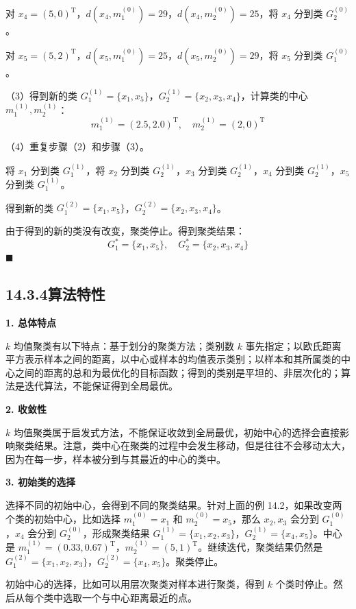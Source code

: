 \documentclass[UTF8, 12pt, fontset=fandol, oneside]{ctexart}
\begin{document}
对 $x_4=(5,0)^{\mathrm{T}}$，$d(x_4,m_1^{(0)})=29$，$d(x_4,m_2^{(0)})=25$，将 $x_4$ 分到类 $G_2^{(0)}$。

对 $x_5=(5,2)^{\mathrm{T}}$，$d(x_5,m_1^{(0)})=25$，$d(x_5,m_2^{(0)})=29$，将 $x_5$ 分到类 $G_1^{(0)}$。

（3）得到新的类 $G_1^{(1)}=\{x_1,x_5\}$，$G_2^{(1)}=\{x_2,x_3,x_4\}$，计算类的中心 $m_1^{(1)},m_2^{(1)}$：
\[
m_1^{(1)}=(2.5,2.0)^{\mathrm{T}},\quad m_2^{(1)}=(2,0)^{\mathrm{T}}
\]

（4）重复步骤（2）和步骤（3）。

将 $x_1$ 分到类 $G_1^{(1)}$，将 $x_2$ 分到类 $G_2^{(1)}$，$x_3$ 分到类 $G_2^{(1)}$，$x_4$ 分到类 $G_2^{(1)}$，$x_5$ 分到类 $G_1^{(1)}$。

得到新的类 $G_1^{(2)}=\{x_1,x_5\}$，$G_2^{(2)}=\{x_2,x_3,x_4\}$。

由于得到的新的类没有改变，聚类停止。得到聚类结果：
\[
G_1^*=\{x_1,x_5\},\quad G_2^*=\{x_2,x_3,x_4\}
\]
\hfill$\blacksquare$

\subsection*{14.3.4\quad 算法特性}

\noindent\textbf{1. 总体特点}

$k$ 均值聚类有以下特点：基于划分的聚类方法；类别数 $k$ 事先指定；以欧氏距离平方表示样本之间的距离，以中心或样本的均值表示类别；以样本和其所属类的中心之间的距离的总和为最优化的目标函数；得到的类别是平坦的、非层次化的；算法是迭代算法，不能保证得到全局最优。

\noindent\textbf{2. 收敛性}

$k$ 均值聚类属于启发式方法，不能保证收敛到全局最优，初始中心的选择会直接影响聚类结果。注意，类中心在聚类的过程中会发生移动，但是往往不会移动太大，因为在每一步，样本被分到与其最近的中心的类中。

\noindent\textbf{3. 初始类的选择}

选择不同的初始中心，会得到不同的聚类结果。针对上面的例 14.2，如果改变两个类的初始中心，比如选择 $m_1^{(0)}=x_1$ 和 $m_2^{(0)}=x_5$，那么 $x_2,x_3$ 会分到 $G_1^{(0)}$，$x_4$ 会分到 $G_2^{(0)}$，形成聚类结果 $G_1^{(1)}=\{x_1,x_2,x_3\}$，$G_2^{(1)}=\{x_4,x_5\}$。中心是 $m_1^{(1)}=(0.33,0.67)^{\mathrm{T}}$，$m_2^{(1)}=(5,1)^{\mathrm{T}}$。继续迭代，聚类结果仍然是 $G_1^{(2)}=\{x_1,x_2,x_3\}$，$G_2^{(2)}=\{x_4,x_5\}$。聚类停止。

初始中心的选择，比如可以用层次聚类对样本进行聚类，得到 $k$ 个类时停止。然后从每个类中选取一个与中心距离最近的点。
\end{document}
